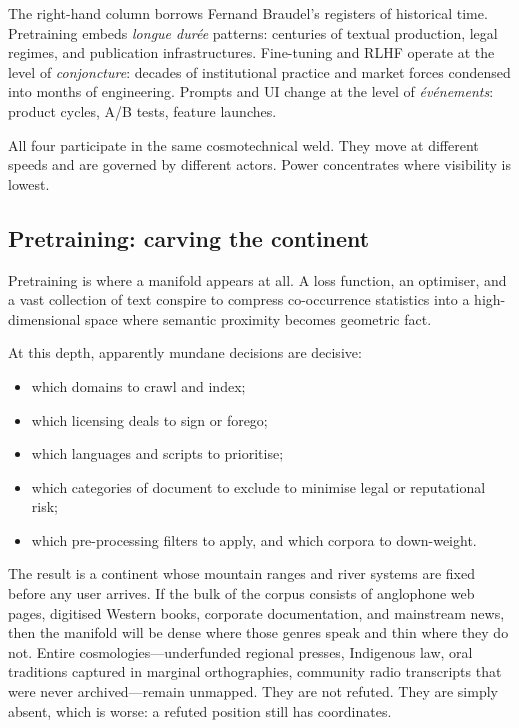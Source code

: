 \documentclass[12pt,a4paper]{article}
\begin{document}
The right-hand column borrows Fernand Braudel's registers of historical time. Pretraining embeds \emph{longue dur\'ee} patterns: centuries of textual production, legal regimes, and publication infrastructures. Fine-tuning and RLHF operate at the level of \emph{conjoncture}: decades of institutional practice and market forces condensed into months of engineering. Prompts and UI change at the level of \emph{\'ev\'enements}: product cycles, A/B tests, feature launches.

All four participate in the same cosmotechnical weld. They move at different speeds and are governed by different actors. Power concentrates where visibility is lowest.

\subsection{Pretraining: carving the continent}

Pretraining is where a manifold appears at all. A loss function, an optimiser, and a vast collection of text conspire to compress co-occurrence statistics into a high-dimensional space where semantic proximity becomes geometric fact.

At this depth, apparently mundane decisions are decisive:

\begin{itemize}
  \item which domains to crawl and index;
  \item which licensing deals to sign or forego;
  \item which languages and scripts to prioritise;
  \item which categories of document to exclude to minimise legal or reputational risk;
  \item which pre-processing filters to apply, and which corpora to down-weight.
\end{itemize}

The result is a continent whose mountain ranges and river systems are fixed before any user arrives. If the bulk of the corpus consists of anglophone web pages, digitised Western books, corporate documentation, and mainstream news, then the manifold will be dense where those genres speak and thin where they do not. Entire cosmologies---underfunded regional presses, Indigenous law, oral traditions captured in marginal orthographies, community radio transcripts that were never archived---remain unmapped. They are not refuted. They are simply absent, which is worse: a refuted position still has coordinates.
\end{document}
